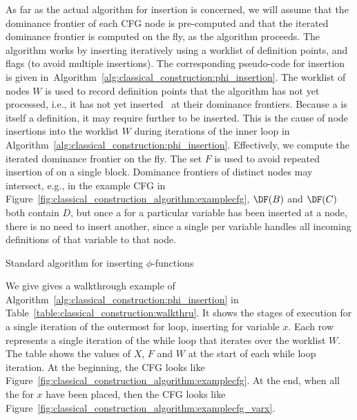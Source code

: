 {As far as the actual algorithm for \phifuns insertion is concerned, we will assume that the dominance frontier of each CFG node is pre-computed and that the iterated dominance frontier is computed on the fly, as the algorithm proceeds. 
The algorithm works by inserting \phifuns iteratively using a worklist of definition points, and flags (to avoid multiple insertions). 
The corresponding pseudo-code for \phifun insertion is given in~Algorithm~\ref{alg:classical_construction:phi_insertion}. 
The worklist of nodes $W$ is used to record definition points that the algorithm has not yet processed, i.e., it has not yet inserted \phifuns\ at their dominance frontiers. 
Because a \phifun is itself a definition, it may require further \phifuns to be inserted. 
This is the cause of node insertions into the worklist $W$ during iterations of the inner loop in Algorithm~\ref{alg:classical_construction:phi_insertion}. 
Effectively, we compute the iterated dominance frontier on the fly. 
The set $F$ is used to avoid repeated insertion of \phifuns on a single block. 
Dominance frontiers of distinct nodes may intersect, e.g., in the example CFG in Figure~\ref{fig:classical_construction_algorithm:examplecfg}, $\DF(B)$ and $\DF(C)$ both contain $D$, but once a \phifun for a particular variable has been inserted at a node, there is no need to insert another, since a single \phifun per variable handles all incoming definitions of that variable to that node.


\begin{algorithm}[h]
\caption{\label{alg:classical_construction:phi_insertion}Standard algorithm for 
inserting $\phi$-functions}
\end{algorithm}

We give gives a walkthrough example of Algorithm~\ref{alg:classical_construction:phi_insertion} in Table~\ref{table:classical_construction:walkthru}. 
It shows the stages of execution for a single iteration of the outermost for loop, inserting \phifuns for variable $x$. 
Each row represents a single iteration of the while loop that iterates over the worklist $W$. 
The table shows the values of $X$, $F$ and $W$ at the start of each while loop iteration. 
At the beginning, the CFG looks like Figure~\ref{fig:classical_construction_algorithm:examplecfg}. 
At the end, when all the \phifuns for $x$ have been placed, then the CFG looks like Figure~\ref{fig:classical_construction_algorithm:examplecfg_varx}.



}
